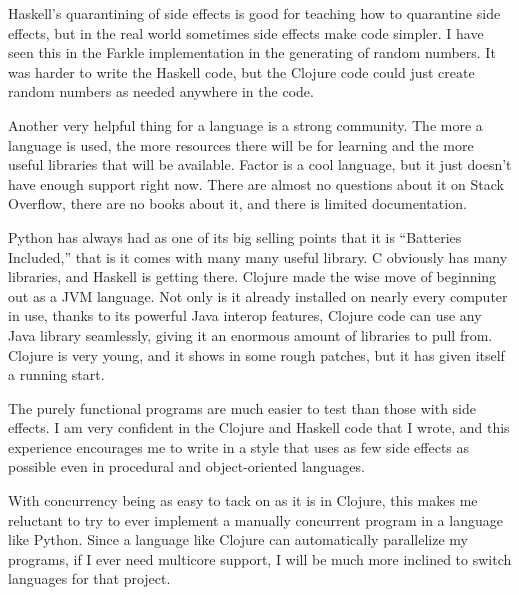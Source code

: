 \documentclass{article}
\begin{document}
Haskell's quarantining of side effects is good for teaching how to quarantine
side effects, but in the real world sometimes side effects make code simpler.  I
have seen this in the Farkle implementation in the generating of random numbers.
It was harder to write the Haskell code, but the Clojure code could just create
random numbers as needed anywhere in the code.

Another very helpful thing for a language is a strong community.  The more a
language is used, the more resources there will be for learning and the more
useful libraries that will be available.  Factor is a cool language, but it just
doesn't have enough support right now.  There are almost no questions about it
on Stack Overflow, there are no books about it, and there is limited
documentation.

Python has always had as one of its big selling points that it is ``Batteries
Included,'' that is it comes with many many useful library.  C obviously has
many libraries, and Haskell is getting there.  Clojure made the wise move of
beginning out as a JVM language.  Not only is it already installed on nearly
every computer in use, thanks to its powerful Java interop features,
Clojure code can use any Java library seamlessly, giving it an enormous amount
of libraries to pull from.  Clojure is very young, and it shows in some rough
patches, but it has given itself a running start.

The purely functional programs are much easier to test than those with side effects.
I am very confident in the Clojure and Haskell code that I wrote, and this experience
encourages me to write in a style that uses as few side effects as possible
even in procedural and object-oriented languages.  

With concurrency being as easy to tack on as it is in Clojure, this makes me
reluctant to try to ever implement a manually concurrent program in a language
like Python.  Since a language like Clojure can automatically parallelize my
programs, if I ever need multicore support, I will be much more inclined to
switch languages for that project.
\end{document}
